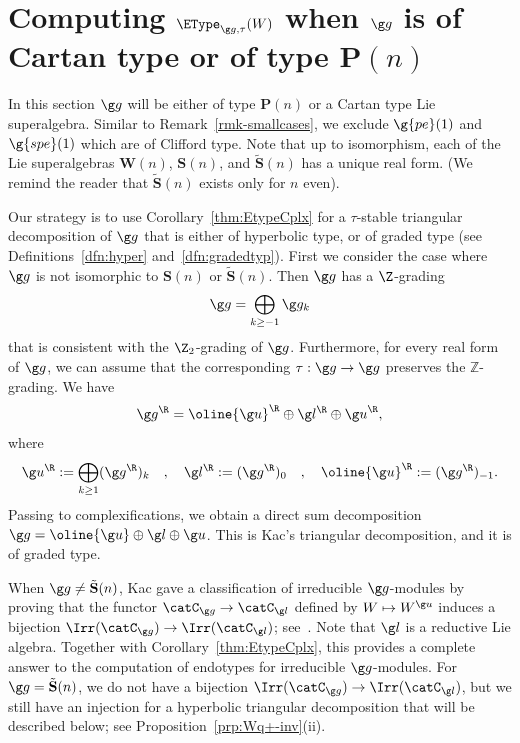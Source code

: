 \documentclass[12pt]{amsart}
\begin{document}
\section{Computing $\EType_{\g g,\tau}(W)$ when $\g g$ is of Cartan type or of type $\mathbf P(n)$}
  
In this section  $\g g$ will be  either 
of type $\mathbf P(n)$ or 
a  Cartan type Lie superalgebra.
Similar to Remark~\ref{rmk-smallcases}, we exclude $\g{pe}(1)$ and $\g{spe}(1)$ which are of Clifford type. 
Note that up to isomorphism, each of the Lie superalgebras $\mathbf{W}(n)$, $\mathbf{S}(n)$, and $\tilde{\mathbf S}(n)$ has a unique real form. (We remind the reader that  $\tilde{\mathbf S}(n)$ exists only for $n$ even). 

Our strategy is to use Corollary~\ref{thm:EtypeCplx} for a $\tau$-stable triangular decomposition of $\g g$ that is either of hyperbolic type, or of graded type  (see Definitions~\ref{dfn:hyper} and~\ref{dfn:gradedtyp}).
First we consider the case where $\g g$ is not isomorphic to 
$\mathbf{S}(n)$ or 
 $\tilde{\mathbf S}(n)$.
Then $\g g$ has a $\Z$-grading
\[
\g g=\bigoplus_{k\geq -1}\g g_k
\] 
that is consistent with the $\Z_2$-grading of $\g g$.  Furthermore,  for every real form of $\g g$,  we can assume that the corresponding  $\tau:\g g\to \g g$ preserves the $\mathbb Z$-grading. 
We have 
\[
\g g^\R=
\oline{\g u}^{\R}\oplus\g l^\R\oplus{\g  u}^{\R},
\]
where
 \[
\g u^\R:=\bigoplus_{k\geq 1}(\g g^\R)_k\quad,\quad
\g l^\R:=(\g g^\R)_0 
\quad,\quad
\oline{\g u}^\R:=(\g g^\R)_{-1}
.\]
Passing to complexifications, we obtain a direct sum decomposition
$\g g=\oline{\g u}\oplus\g l\oplus \g u$. This is Kac's triangular decomposition, and it  is of graded type. 

\begin{rmk}
\label{rmk:KacClassification}
When $\g g\neq \tilde{\mathbf S}(n)$, Kac gave a classification of irreducible $\g g$-modules by proving that  the functor $\catC_{\g g}\to  \catC_{\g l}$ defined by $W\mapsto W^{\g u}$ induces a bijection $\Irr(\catC_{\g g})\to \Irr(\catC_{\g l})$; see~\cite[Prop 5.2.5]{KacAdvances}. Note that $\g l$ is a reductive Lie algebra. Together with Corollary~\ref{thm:EtypeCplx}, this provides a complete answer to the computation of endotypes for irreducible $\g g$-modules. 
For $\g g=\tilde{\mathbf S}(n)$, we do not have a bijection $\Irr(\catC_{\g g})\to \Irr(\catC_{\g l})$, but we still have an injection for a hyperbolic triangular decomposition that will be described below; see Proposition~\ref{prp:Wq+-inv}(ii).
\end{rmk}
\end{document}
